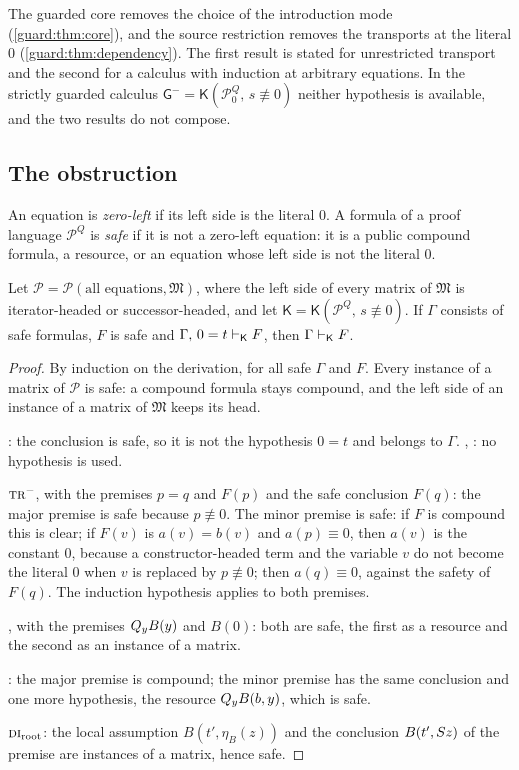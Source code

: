 The guarded core removes the choice of the introduction mode
(\cref{guard:thm:core}), and the source restriction removes the transports
at the literal $0$ (\cref{guard:thm:dependency}).  The first result is
stated for unrestricted transport and the second for a calculus with
induction at arbitrary equations.  In the strictly guarded calculus
$\mathsf G^{-}=\mathsf K(\mathcal P_0^{Q},\,s\not\equiv 0)$ neither
hypothesis is available, and the two results do not compose.

\subsection{The obstruction}

An equation is \emph{zero-left} if its left side is the literal $0$.  A
formula of a proof language $\mathcal P^{Q}$ is \emph{safe} if it is not a
zero-left equation: it is a public compound formula, a resource, or an
equation whose left side is not the literal $0$.

\begin{proposition}
\label{guard:prop:inert}
Let $\mathcal P=\mathcal P(\text{all equations},\mathfrak M)$, where the
left side of every matrix of $\mathfrak M$ is iterator-headed or
successor-headed, and let
$\mathsf K=\mathsf K(\mathcal P^{Q},\,s\not\equiv 0)$.  If $\Gamma$ consists
of safe formulas, $F$ is safe and $\Gamma,\,0=t\vdash_{\mathsf K}F$, then
$\Gamma\vdash_{\mathsf K}F$.
\end{proposition}

\begin{proof}
By induction on the derivation, for all safe $\Gamma$ and $F$.  Every
instance of a matrix of $\mathcal P$ is safe: a compound formula stays
compound, and the left side of an instance of a matrix of $\mathfrak M$
keeps its head.

: the conclusion is safe, so it is not the hypothesis $0=t$
and belongs to $\Gamma$.  , : no hypothesis is
used.

$\rulename{Tr}^{-}$, with the premises $p=q$ and $F(p)$ and the safe
conclusion $F(q)$: the major premise is safe because $p\not\equiv 0$.  The
minor premise is safe: if $F$ is compound this is clear; if $F(v)$ is
$a(v)=b(v)$ and $a(p)\equiv 0$, then $a(v)$ is the constant $0$, because a
constructor-headed term and the variable $v$ do not become the literal $0$
when $v$ is replaced by $p\not\equiv 0$; then $a(q)\equiv 0$, against the
safety of $F(q)$.  The induction hypothesis applies to both premises.

, with the premises $Q_{y}B(y)$ and $B(0)$: both are safe, the
first as a resource and the second as an instance of a matrix.

: the major premise is compound; the minor premise has the
same conclusion and one more hypothesis, the resource $Q_{y}B(b,y)$, which
is safe.

$\rulename{DI}_{\mathrm{root}}$: the local assumption $B(t',\eta_B(z))$ and
the conclusion $B(t',S z)$ of the premise are instances of a matrix,
hence safe.
\end{proof}

